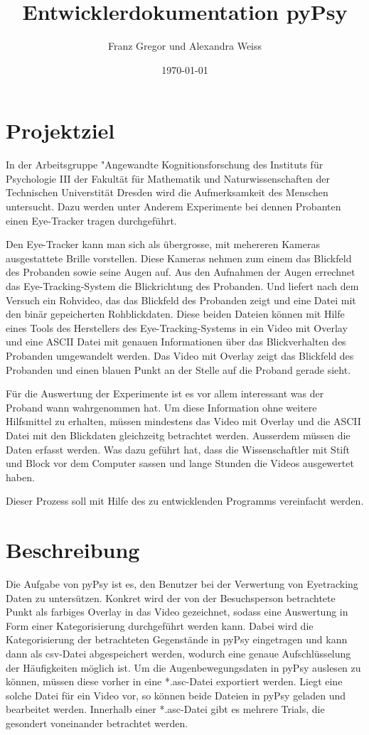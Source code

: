 \documentclass[a4paper,draft]{scrartcl}
\title{Entwicklerdokumentation pyPsy}
\author{Franz Gregor und Alexandra Weiss}
\date{\today}
\begin{document}
\maketitle
\newpage
\tableofcontents
\newpage
\section{Projektziel}
In der Arbeitsgruppe "Angewandte Kognitionsforschung des Instituts f\"ur Psychologie III der Fakult\"at f\"ur Mathematik und Naturwissenschaften der Technischen Universtit\"at Dresden wird die Aufmerksamkeit des Menschen untersucht.
Dazu werden unter Anderem Experimente bei dennen Probanten einen Eye-Tracker tragen durchgef\"uhrt.

Den Eye-Tracker kann man sich als \"ubergrosse, mit mehereren Kameras ausgestattete Brille vorstellen.
Diese Kameras nehmen zum einem das Blickfeld des Probanden sowie seine Augen auf.
Aus den Aufnahmen der Augen errechnet das Eye-Tracking-System die Blickrichtung des Probanden.
Und liefert nach dem Versuch ein Rohvideo, das das Blickfeld des Probanden zeigt und eine Datei mit den bin\"ar gepeicherten Rohblickdaten.
Diese beiden Dateien k\"onnen mit Hilfe eines Tools des Herstellers des Eye-Tracking-Systems in ein Video mit Overlay und eine ASCII Datei mit genauen Informationen \"uber das Blickverhalten des Probanden umgewandelt werden.
Das Video mit Overlay zeigt das Blickfeld des Probanden und einen blauen Punkt an der Stelle auf die Proband gerade sieht.

F\"ur die Auswertung der Experimente ist es vor allem interessant was der Proband wann wahrgenommen hat.
Um diese Information ohne weitere Hilfsmittel zu erhalten, m\"ussen mindestens das Video mit Overlay und die ASCII Datei mit den Blickdaten gleichzeitg betrachtet werden.
Ausserdem m\"ussen die Daten erfasst werden.
Was dazu gef\"uhrt hat, dass die Wissenschaftler mit Stift und Block vor dem Computer sassen und lange Stunden die Videos ausgewertet haben.

Dieser Prozess soll mit Hilfe des zu entwicklenden Programms vereinfacht werden.

\section{Beschreibung}
Die Aufgabe von pyPsy ist es, den Benutzer bei der Verwertung von Eyetracking Daten zu untersützen. Konkret wird der von der Besuchsperson betrachtete Punkt als farbiges Overlay in das Video gezeichnet, sodass eine Auswertung in Form einer Kategorisierung durchgeführt werden kann. Dabei wird die Kategorisierung der betrachteten Gegenstände in pyPsy eingetragen und kann dann als csv-Datei abgespeichert werden, wodurch eine genaue Aufschlüsselung der Häufigkeiten möglich ist. 
Um die Augenbewegungsdaten in pyPsy auslesen zu können, müssen diese vorher in eine *.asc-Datei exportiert werden. Liegt eine solche Datei für ein Video vor, so können beide Dateien in pyPsy geladen und bearbeitet werden.
Innerhalb einer *.asc-Datei gibt es mehrere Trials, die gesondert voneinander betrachtet werden.
\end{document}
